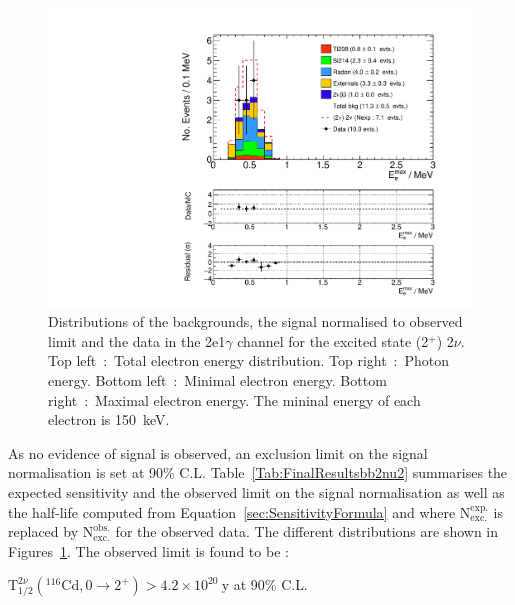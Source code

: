 \documentclass[main.tex]{subfiles}
\begin{document}
\begin{figure} [h!]
\begin{center}
\includegraphics[scale=0.37]{pictures/FinalResults/bb2nu2/250/Eemax_bb2nu2.pdf}
\end{center}
\caption{Distributions of the backgrounds, the signal normalised to observed limit and the data in the 2e1$\gamma$ channel for the excited state (2$^+$) 2$\nu$. Top left~:~Total electron energy distribution. Top right~:~Photon energy. Bottom left~:~Minimal electron energy. Bottom right~:~Maximal electron energy. The mininal energy of each electron is 150~keV.}
\label{plot:SEeAndEg250bb2nu2}
\end{figure}


\NI As no evidence of signal is observed, an exclusion limit on the signal normalisation is set at 90\% C.L. Table~\ref{Tab:FinalResultsbb2nu2} summarises the expected sensitivity and the observed limit on the signal normalisation as well as the half-life computed from Equation~\ref{sec:SensitivityFormula} and where $\text{N}_{\text{exc.}}^{\text{exp.}}$ is replaced by $\text{N}_{\text{exc.}}^{\text{obs.}}$ for the observed data. The different distributions are shown in Figures~\ref{plot:SEeAndEg250bb2nu2}. The observed limit is found to be :



\begin{center}
$ \text{T}_{\text{1/2}}^{\text{2}\nu} (^{\text{116}} \text{Cd}, \text{0} \rightarrow \text{2}^{+}) > \text{4.2} \times \text{10}^{\text{20}}~\text{y}$ at 90\% C.L.
\end{center}
\end{document}
